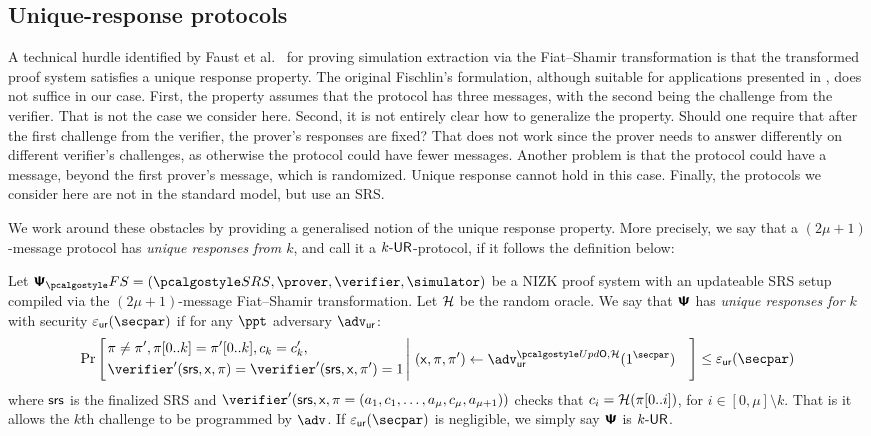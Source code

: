 \subsection{Unique-response protocols}
A technical hurdle identified by Faust et al.~\cite{INDOCRYPT:FKMV12} for proving
simulation extraction via the Fiat--Shamir transformation is that the transformed
proof system satisfies a unique response property. The original Fischlin's
formulation, although suitable for applications presented in
\cite{C:Fischlin05,INDOCRYPT:FKMV12}, does not suffice in our case. First, the
property assumes that the protocol has three messages, with the second being the
challenge from the verifier. That is not the case we consider here. Second, it is not
entirely clear how to generalize the property. Should one require that after the
first challenge from the verifier, the prover's responses are fixed?  That does not
work since the prover needs to answer differently on different verifier's challenges,
as otherwise the protocol could have fewer messages.  Another problem is that the
protocol could have a message, beyond the first prover's message, which is
randomized. Unique response cannot hold in this case. Finally, the protocols we
consider here are not in the standard model, but use an SRS.

We work around these obstacles by providing a generalised notion of the unique
response property. More precisely, we say that a $(2\mu + 1)$-message protocol
has \emph{unique responses from $k$}, and call it a ${k\text{-}\mathsf{UR}}$-protocol, if it
follows the definition below:

\begin{definition}
Let $\psfs = (\SRScer, \prover, \verifier, \simulator)$ be a NIZK proof system with an updateable SRS setup compiled via the $(2\mu + 1)$-message Fiat--Shamir transformation. Let $\mathcal{H}$ be the random oracle. 
We say that $\bm{\mathsf{\Psi}}$ has \emph{unique responses for $k$} with security $\epsur(\secpar)$ if for any $\ppt$ adversary $\advur$:
  \[
	\Pr\left[
		\left.
	\begin{aligned}
	& \zkproof \neq \zkproof', \zkproof[0..k] = \zkproof'[0..k], c_k = c'_k,  \\
	& \verifier' (\srs, \inp, \zkproof) =
	\verifier' (\srs, \inp, \zkproof') = 1  \\
	\end{aligned}
	\,\right|\,
	\begin{aligned}
		& (\inp, \zkproof, \zkproof') \gets \advur^{\initU,\ro}(1^\secpar) 
	\end{aligned}
	\right] \leq \epsur(\secpar) 
	\]
	where $\mathsf{srs}$ is the finalized SRS and $\verifier'(\srs,\inp,\zkproof=(a_1,c_1, \dots, a_\mu,c_\mu,a_{\mu+1}))$ checks that $c_i = \mathcal{H}(\pi[0..i])$, for $i\in [0,\mu]\setminus k$. That is it allows the $k$th challenge to be programmed by $\adv$. 
	If $\epsur(\secpar)$ is negligible, we simply say $\bm{\mathsf{\Psi}}$ is ${k\text{-}\mathsf{UR}}$.
\end{definition}

